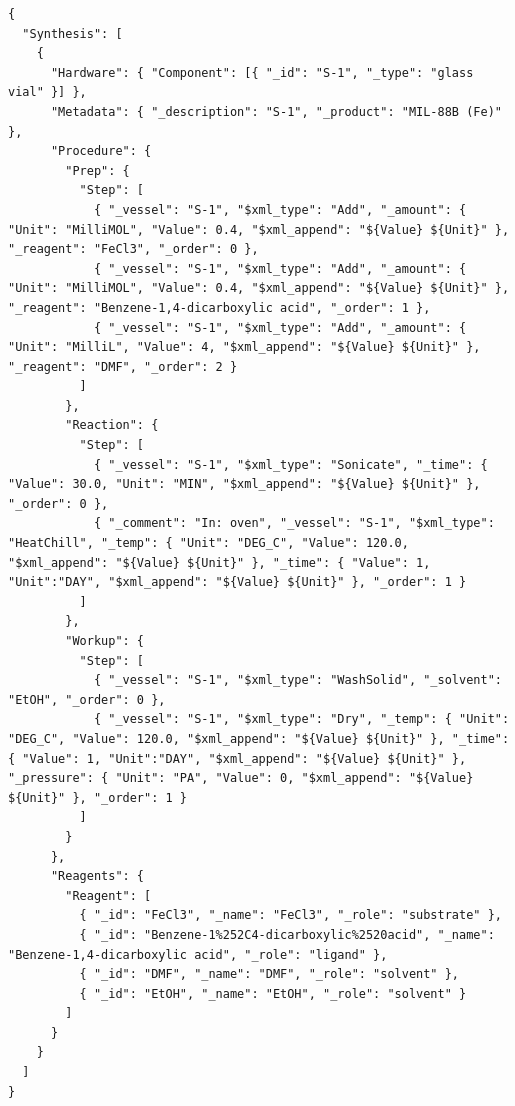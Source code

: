\begin{lstlisting}[float=htbp,style=json,caption={Representative JSON excerpt from the MOF synthesis dataset for \texttt{S-1}},label={lst:application_mof_json_example_s_1}]
{
  "Synthesis": [
    {
      "Hardware": { "Component": [{ "_id": "S-1", "_type": "glass vial" }] },
      "Metadata": { "_description": "S-1", "_product": "MIL-88B (Fe)" },
      "Procedure": {
        "Prep": {
          "Step": [
            { "_vessel": "S-1", "$xml_type": "Add", "_amount": { "Unit": "MilliMOL", "Value": 0.4, "$xml_append": "${Value} ${Unit}" }, "_reagent": "FeCl3", "_order": 0 },
            { "_vessel": "S-1", "$xml_type": "Add", "_amount": { "Unit": "MilliMOL", "Value": 0.4, "$xml_append": "${Value} ${Unit}" }, "_reagent": "Benzene-1,4-dicarboxylic acid", "_order": 1 },
            { "_vessel": "S-1", "$xml_type": "Add", "_amount": { "Unit": "MilliL", "Value": 4, "$xml_append": "${Value} ${Unit}" }, "_reagent": "DMF", "_order": 2 }
          ]
        },
        "Reaction": {
          "Step": [
            { "_vessel": "S-1", "$xml_type": "Sonicate", "_time": { "Value": 30.0, "Unit": "MIN", "$xml_append": "${Value} ${Unit}" }, "_order": 0 },
            { "_comment": "In: oven", "_vessel": "S-1", "$xml_type": "HeatChill", "_temp": { "Unit": "DEG_C", "Value": 120.0, "$xml_append": "${Value} ${Unit}" }, "_time": { "Value": 1, "Unit":"DAY", "$xml_append": "${Value} ${Unit}" }, "_order": 1 }
          ]
        },
        "Workup": {
          "Step": [
            { "_vessel": "S-1", "$xml_type": "WashSolid", "_solvent": "EtOH", "_order": 0 },
            { "_vessel": "S-1", "$xml_type": "Dry", "_temp": { "Unit": "DEG_C", "Value": 120.0, "$xml_append": "${Value} ${Unit}" }, "_time": { "Value": 1, "Unit":"DAY", "$xml_append": "${Value} ${Unit}" }, "_pressure": { "Unit": "PA", "Value": 0, "$xml_append": "${Value} ${Unit}" }, "_order": 1 }
          ]
        }
      },
      "Reagents": {
        "Reagent": [
          { "_id": "FeCl3", "_name": "FeCl3", "_role": "substrate" },
          { "_id": "Benzene-1%252C4-dicarboxylic%2520acid", "_name": "Benzene-1,4-dicarboxylic acid", "_role": "ligand" },
          { "_id": "DMF", "_name": "DMF", "_role": "solvent" },
          { "_id": "EtOH", "_name": "EtOH", "_role": "solvent" }
        ]
      }
    }
  ]
}
\end{lstlisting}

